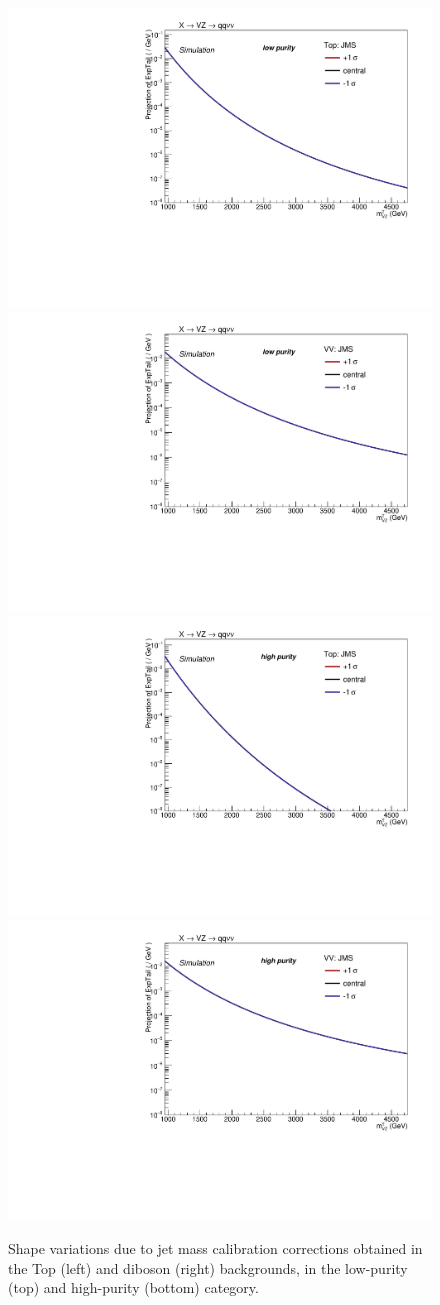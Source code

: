  \begin{figure}[!htb]
   \begin{center}
     \includegraphics[width=.495\textwidth]{plotsAlpha_tesi/XVZnnlp/SysTop_JMS.pdf}
     \includegraphics[width=.495\textwidth]{plotsAlpha_tesi/XVZnnlp/SysVV_JMS.pdf}
     \\
     \includegraphics[width=.495\textwidth]{plotsAlpha_tesi/XVZnnhp/SysTop_JMS.pdf}
     \includegraphics[width=.495\textwidth]{plotsAlpha_tesi/XVZnnhp/SysVV_JMS.pdf}

   \end{center}
   \caption{Shape variations due to jet mass calibration corrections obtained in the Top (left) and diboson (right) backgrounds, in the low-purity (top) and high-purity (bottom) category.}
   \label{fig:sysJMS}
 \end{figure}


